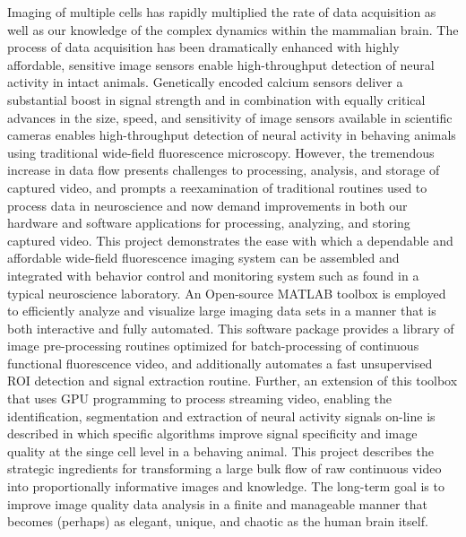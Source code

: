 
Imaging of multiple cells has rapidly multiplied the rate of data acquisition as well as our knowledge of the complex dynamics within the mammalian brain.
The process of data acquisition has been dramatically enhanced with highly affordable, sensitive image sensors enable high-throughput detection of neural activity in intact animals.
Genetically encoded calcium sensors deliver a substantial boost in signal strength and in combination with equally critical advances in the size, speed, and sensitivity of image sensors available in scientific cameras enables high-throughput detection of neural activity in behaving animals using traditional wide-field fluorescence microscopy.
However, the tremendous increase in data flow presents challenges to processing, analysis, and storage of captured video, and prompts a reexamination of traditional routines used to process data in neuroscience and now demand improvements in both our hardware and software applications for processing, analyzing, and storing captured video.
This project demonstrates the ease with which a dependable and affordable wide-field fluorescence imaging system can be assembled and integrated with behavior control and monitoring system such as found in a typical neuroscience laboratory.
An Open-source MATLAB toolbox is employed to efficiently analyze and visualize large imaging data sets in a manner that is both interactive and fully automated.
This software package provides a library of image pre-processing routines optimized for batch-processing of continuous functional fluorescence video, and additionally automates a fast unsupervised ROI detection and signal extraction routine.
Further, an extension of this toolbox that uses GPU programming to process streaming video, enabling the identification, segmentation and extraction of neural activity signals on-line is described in which specific algorithms improve signal specificity and image quality at the singe cell level in a behaving animal.
This  project describes the strategic ingredients for transforming a large bulk flow of raw continuous video into proportionally informative images and knowledge.
The long-term goal is to improve image quality data analysis in a finite and manageable manner that becomes (perhaps) as elegant, unique, and chaotic as the human brain itself.
